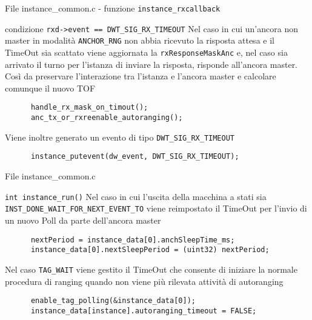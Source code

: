 \begin{frame}[fragile]{File instance\_common.c - funzione \lstinline!instance_rxcallback!}
  \begin{block}{condizione \lstinline!rxd->event == DWT_SIG_RX_TIMEOUT!}
    Nel caso in cui un'ancora \alert{non} master in modalità \lstinline!ANCHOR_RNG! non abbia ricevuto la risposta attesa e il TimeOut sia scattato viene
    aggiornata la \lstinline!rxResponseMaskAnc! e, nel caso sia arrivato il turno per l'istanza di inviare la risposta, risponde all'ancora master. Così
    da preservare l'interazione tra l'istanza e l'ancora master e calcolare comunque il nuovo TOF
    \begin{lstlisting}
      handle_rx_mask_on_timout();
      anc_tx_or_rxreenable_autoranging();
    \end{lstlisting}
    Viene inoltre generato un evento di tipo \lstinline!DWT_SIG_RX_TIMEOUT!
    \begin{lstlisting}
      instance_putevent(dw_event, DWT_SIG_RX_TIMEOUT);
    \end{lstlisting}
  \end{block}
\end{frame}

\begin{frame}[fragile]{File instance\_common.c}
  \begin{block}{\lstinline!int instance_run()!}
    Nel caso in cui l'uscita della macchina a stati sia \lstinline!INST_DONE_WAIT_FOR_NEXT_EVENT_TO! viene reimpostato il TimeOut per l'invio di un nuovo Poll
    da parte dell'ancora \alert{master}
    \begin{lstlisting}
      nextPeriod = instance_data[0].anchSleepTime_ms;
      instance_data[0].nextSleepPeriod = (uint32) nextPeriod;
    \end{lstlisting}
    Nel caso \lstinline!TAG_WAIT! viene gestito il TimeOut che consente di iniziare la normale procedura di ranging quando
    non viene più rilevata attività di autoranging
    \begin{lstlisting}
      enable_tag_polling(&instance_data[0]);
      instance_data[instance].autoranging_timeout = FALSE;
    \end{lstlisting}
  \end{block}
\end{frame}


    
